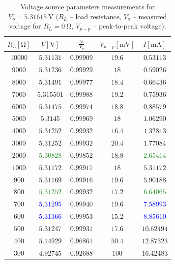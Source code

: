 \begin{table}[H]
	\centering
	\begin{tabular}{ c | c | c | c | c}
		$R_L [\unit{\ohm}]$ & $V [\unit{\volt}]$ & $\frac{V}{V_o}$ & $V_{p-p}[\unit{\milli\volt}]$ & $I [\unit{\milli\ampere}]$ \\
		\hline
		$10000$ & $5.31131$ & $0.99909$ & $19.6$ & $0.53113$ \\
		$9000$ & $5.31236$ & $0.99929$ & $18$ & $0.59026$ \\
		$8000$ & $5.31491$ & $0.99977$ & $18.4$ & $0.66436$ \\
		$7000$ & $5.315501$ & $0.99988$ & $19.2$ & $0.75936$ \\
		$6000$ & $5.31475$ & $0.99974$ & $18.8$ & $0.88579$ \\
		$5000$ & $5.3145$ & $0.99969$ & $18$ & $1.06290$ \\
		$4000$ & $5.31252$ & $0.99932$ & $16.4$ & $1.32813$ \\
		$3000$ & \textcolor{BrickRed}{$5.31252$} & $0.99932$ & $20.4$ & \textcolor{BrickRed}{$1.77084$} \\
		$2000$ & \textcolor{ForestGreen}{$5.30828$} & $0.99852$ & $18.8$ & \textcolor{ForestGreen}{$2.65414$} \\
		$1000$ & \textcolor{BrickRed}{$5.31172$} & $0.99917$ & $18$ & \textcolor{BrickRed}{$5.31172$} \\
		$900$ & $5.31169$ & $0.99916$ & $19.6$ & $5.90188$ \\
		$800$ & \textcolor{ForestGreen}{$5.31252$} & $0.99932$ & $17.2$ & \textcolor{ForestGreen}{$6.64065$} \\
		$700$ & \textcolor{blue}{$5.31295$} & $0.99940$ & $19.6$ & \textcolor{blue}{$7.58993$} \\
		$600$ & \textcolor{blue}{$5.31366$} & $0.99953$ & $15.2$ & \textcolor{blue}{$8.85610$} \\
		$500$ & $5.31247$ & $0.99931$ & $17.6$ & $10.62494$ \\
		$400$ & $5.14929$ & $0.96861$ & $50.4$ & $12.87323$ \\
		$300$ & $4.92745$ & $0.92688$ & $100$ & $16.42483$ \\ 
	\end{tabular}
	\caption{Voltage source parameters measurements for $V_o=\SI{5.31615}{\volt}$ ($R_L$ -- load resistance, $V_o$ -- measured voltage for $R_L = \SI{0}{\ohm}$, $V_{p-p}$ -- peak-to-peak voltage).}
	\label{tab:voltage_osc}
\end{table}

